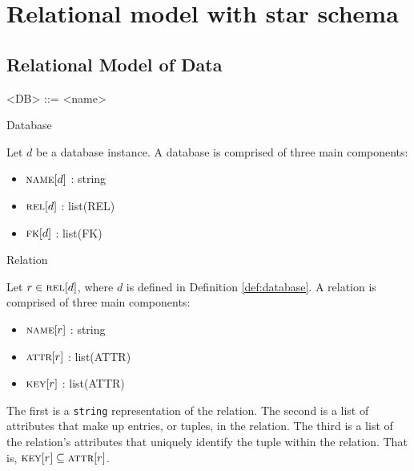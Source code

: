 \section{Relational model with star schema}
	\subsection{Relational Model of Data}
		\begin{grammar}
		
			<DB> ::= <name>
			
		\end{grammar}
		
		\begin{defn}{Database}
		\label{def:database}
		
			Let $d$ be a database instance.  A database is comprised of three main components:
			
			\begin{itemize}
				\item $\textsc{name}\lbrack d\rbrack$ : string
				\item $\textsc{rel}\lbrack d\rbrack$ : list(REL)
				\item $\textsc{fk}\lbrack d\rbrack$ : list(FK)
			\end{itemize}
		\end{defn}
		
		\begin{defn}{Relation}
		\label{def:relation}
		
			Let $r \in \textsc{rel}\lbrack d\rbrack$, where $d$ is defined in Definition \ref{def:database}.  A relation is comprised of three main components:
			
			\begin{itemize}
				\item $\textsc{name}\lbrack r\rbrack$ : string
				\item $\textsc{attr}\lbrack r\rbrack$ : list(ATTR)
				\item $\textsc{key}\lbrack r\rbrack$ : list(ATTR)
			\end{itemize}
			
			The first is a \texttt{string} representation of the relation.  The second is a list of attributes that make up entries, or tuples, in the relation.  The third is a list of the relation's attributes that uniquely identify the tuple within the relation.  That is, $\textsc{key}\lbrack r\rbrack \subseteq \textsc{attr}\lbrack r\rbrack$.
		\end{defn}
		
